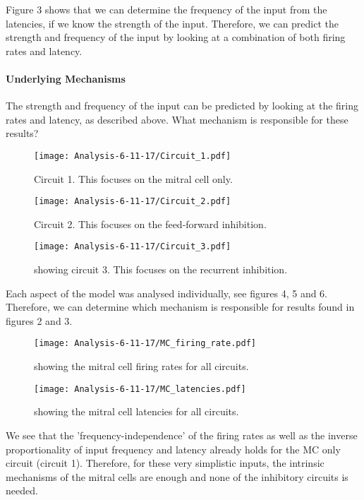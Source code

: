 \documentclass[11pt]{report}
\begin{document}
Figure 3 shows that we can determine the frequency of the input from the latencies, if we know the strength of the input. Therefore, we can predict the strength and frequency of the input by looking at a combination of both firing rates and latency.

\paragraph{Underlying Mechanisms}
The strength and frequency of the input can be predicted by looking at the firing rates and latency, as described above. What mechanism is responsible for these results?

\begin{figure}[!ht]
\centering
\texttt{[image: Analysis-6-11-17/Circuit\_1.pdf]}
\caption{Circuit 1. This focuses on the mitral cell only.}
\end{figure} 

\begin{figure}[!h]
\centering
\texttt{[image: Analysis-6-11-17/Circuit\_2.pdf]}
\caption{Circuit 2. This focuses on the feed-forward inhibition.}
\end{figure} 
\newpage

\begin{figure}[!ht]
\centering
\texttt{[image: Analysis-6-11-17/Circuit\_3.pdf]}
\caption{showing circuit 3. This focuses on the recurrent inhibition.}
\end{figure} 

Each aspect of the model was analysed individually, see figures 4, 5 and 6. Therefore, we can determine which mechanism is responsible for results found in figures 2 and 3.
\newpage

\begin{figure}[!ht]
\centering
\texttt{[image: Analysis-6-11-17/MC\_firing\_rate.pdf]}
\caption{showing the mitral cell firing rates for all circuits.}
\end{figure} 

\begin{figure}[!ht]
\centering
\texttt{[image: Analysis-6-11-17/MC\_latencies.pdf]}
\caption{showing the mitral cell latencies for all circuits.}
\end{figure}

We see that the 'frequency-independence' of the firing rates as well as the inverse proportionality of input frequency and latency already holds for the MC only circuit (circuit 1). Therefore,
for these very simplistic inputs, the intrinsic mechanisms of the mitral cells are enough and none of the inhibitory circuits is needed.
\end{document}
